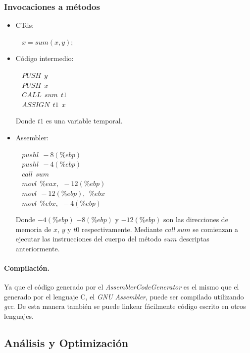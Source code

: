 \documentclass[11pt,a4paper]{article}
\begin{document}
\subsubsection{Invocaciones a métodos}
\begin{itemize}
	\item CTds:
		\begin{flushleft}
			$\ \ \ \ x = sum(x,y);$
		\end{flushleft}
	\item Código intermedio:
		\begin{flushleft}
			$\ \ \ \ PUSH \ \ y$ \\
			$\ \ \ \ PUSH \ \ x$ \\			
			$\ \ \ \ CALL \ \ sum \ \ t1$ \\
			$\ \ \ \ ASSIGN \ \ t1 \ \ x$
		\end{flushleft}
		Donde $t1$ es una variable temporal.
	\item Assembler:
		\begin{flushleft}
			$\ \ \ \ pushl \ \ -8(\%ebp)$ \\
			$\ \ \ \ pushl \ \ -4(\%ebp)$ \\
			$\ \ \ \ call \ \ sum$ \\
			$\ \ \ \ movl \ \ \%eax, \ \ -12(\%ebp)$ \\
			$\ \ \ \ movl \ \ -12(\%ebp), \ \ \%ebx$ \\ 
			$\ \ \ \ movl \ \ \%ebx, \ \ -4(\%ebp)$	
		\end{flushleft}
		Donde $-4(\%ebp)$  $-8(\%ebp)$ y $-12(\%ebp)$ son las direcciones de memoria de $x$, $y$ y $t0$ respectivamente. Mediante $call \ sum$ se comienzan a ejecutar las instrucciones del cuerpo del método $sum$ descriptas anteriormente.
\end{itemize}

\paragraph{Compilación.} Ya que el código generado por el  \textit{AssemblerCodeGenerator} es el mismo que el generado por el lenguaje C, el \textit{GNU Assembler}, puede ser compilado utilizando \textit{gcc}. De esta manera también se puede linkear fácilmente código escrito en otros lenguajes.

\subsection{Análisis y Optimización} 
\label{subsec:opt}
\end{document}
